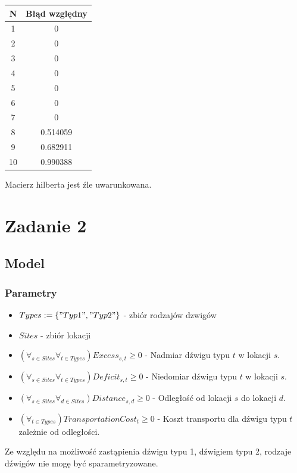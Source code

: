\documentclass{article}
\begin{document}
\begin{center}
    \begin{tabular}{| c | c |}
        \hline
        N & Błąd względny \\ \hline
        1 & 0 \\ \hline
        2 & 0 \\ \hline
        3 & 0 \\ \hline
        4 & 0 \\ \hline
        5 & 0 \\ \hline
        6 & 0 \\ \hline
        7 & 0 \\ \hline 
        8 & 0.514059 \\ \hline
        9 & 0.682911 \\ \hline 
        10 & 0.990388 \\ \hline
    \end{tabular}
\end{center}

Macierz hilberta jest źle uwarunkowana.

\section{Zadanie 2}
\subsection{Model}
\subsubsection{Parametry}
\begin{itemize}
    \item $Types := \{"Typ 1", "Typ 2"\}$ - zbiór rodzajów dzwigów 
    \item $Sites$ - zbiór lokacji 
    \item $(\forall_{s \in Sites} \forall_{t \in Types}) Excess_{s,t} \ge 0$ - Nadmiar dźwigu typu $t$ w lokacji $s$.
    \item $(\forall_{s \in Sites} \forall_{t \in Types}) Deficit_{s,t} \ge 0$ - Niedomiar dźwigu typu $t$ w lokacji $s$.
    \item $(\forall_{s \in Sites} \forall_{d \in Sites}) Distance_{s,d} \ge 0$ - Odległość od lokacji $s$ do lokacji $d$.
    \item $(\forall_{t \in Types}) TransportationCost_{t} \ge 0$ - Koszt transportu dla dźwigu typu $t$ zależnie od odległości.
\end{itemize}
Ze względu na możliwość zastąpienia dźwigu typu 1, dźwigiem typu 2, rodzaje dźwigów nie mogę być sparametryzowane.
\end{document}
